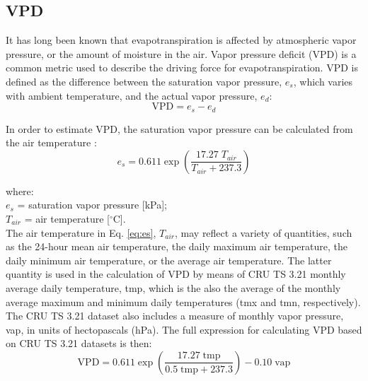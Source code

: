 \subsection{VPD}
\label{sec:gepvpd}
It has long been known that evapotranspiration is affected by atmospheric vapor pressure, or the amount of moisture in the air. 
Vapor pressure deficit (VPD) is a common metric used to describe the driving force for evapotranspiration.  
VPD is defined as the difference between the saturation vapor pressure, $e_s$, which varies with ambient temperature, and the actual vapor pressure, $e_d$:
\begin{equation}
\label{eq:vpd_basic}
    \text{VPD} = e_s - e_d
\end{equation} 

In order to estimate VPD, the saturation vapor pressure can be calculated from the air temperature \parencite[Eq. 5.1]{abtew13}:
%
\begin{equation}
\label{eq:es}
    e_s = 0.611 \exp \left( \frac{17.27\; T_{air}}{T_{air} + 237.3} \right)
\end{equation}

\noindent where:\\
\indent $e_s$ = saturation vapor pressure [kPa];\\
\indent $T_{air}$ = air temperature [$^{\circ}$C].\\

\noindent The air temperature in Eq. \ref{eq:es}, $T_{air}$, may reflect a variety of quantities, such as the 24-hour mean air temperature, the daily maximum air temperature, the daily minimum air temperature, or the average air temperature.  
The latter quantity is used in the calculation of VPD by means of CRU TS 3.21 monthly average daily temperature, tmp, which is the also the average of the monthly average maximum and minimum daily temperatures (tmx and tmn, respectively).  
The CRU TS 3.21 dataset also includes a measure of monthly vapor pressure, vap, in units of hectopascals (hPa).
The full expression for calculating VPD based on CRU TS 3.21 datasets is then:
\begin{equation}
\label{eq:vpd}
    \text{VPD} = 0.611 \exp \left( \frac{17.27\; \text{tmp}}
                 {0.5\; \text{tmp} + 237.3} \right) - 0.10\; \text{vap}
\end{equation}

